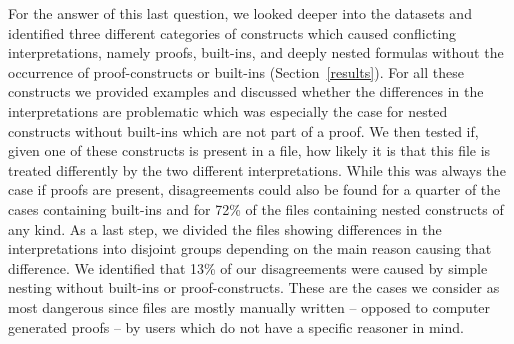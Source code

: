 For the answer of this last question, we looked deeper into the datasets and identified three different categories of constructs which
caused conflicting interpretations, namely proofs, built-ins, and deeply nested formulas without the occurrence of proof-constructs or built-ins 
(Section~\ref{results}). For all these constructs we provided examples and discussed whether the differences in the interpretations are problematic which was especially
the case for nested constructs without built-ins which are not part of a proof. 
We then tested if, given one of these constructs is present in a file, how likely it is 
that this file is treated differently by the two different interpretations. While this was always the case if proofs are present, 
disagreements could also be found for a quarter of the cases containing built-ins and for 72\% of the files containing nested constructs of any kind.
As a last step, we divided the files showing differences in the interpretations into disjoint groups depending on the main reason  causing that difference.
We identified that 13\% of our disagreements were caused by simple nesting without built-ins or proof-constructs. These are the cases we consider as most dangerous 
since files are mostly manually written -- opposed to computer generated proofs -- by users which do not have a specific reasoner in mind.
\\

